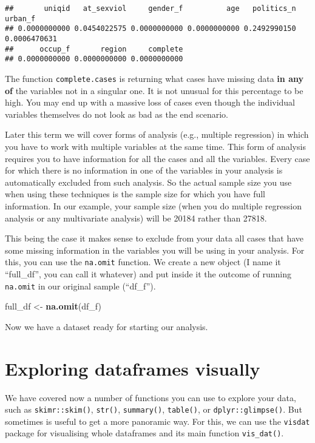 \documentclass[
]{book}
\newenvironment{Shaded}{\begin{snugshade}}{\end{snugshade}}
\newcommand{\FunctionTok}[1]{\textcolor[rgb]{0.13,0.29,0.53}{\textbf{#1}}}
\newcommand{\NormalTok}[1]{#1}
\newcommand{\OtherTok}[1]{\textcolor[rgb]{0.56,0.35,0.01}{#1}}
\begin{document}
\begin{verbatim}
##       uniqid   at_sexviol     gender_f          age   politics_n      urban_f 
## 0.0000000000 0.0454022575 0.0000000000 0.0000000000 0.2492990150 0.0006470631 
##      occup_f       region     complete 
## 0.0000000000 0.0000000000 0.0000000000
\end{verbatim}

The function \texttt{complete.cases} is returning what cases have missing data \textbf{in any of} the variables not in a singular one. It is not unusual for this percentage to be high. You may end up with a massive loss of cases even though the individual variables themselves do not look as bad as the end scenario.

Later this term we will cover forms of analysis (e.g., multiple regression) in which you have to work with multiple variables at the same time. This form of analysis requires you to have information for all the cases and all the variables. Every case for which there is no information in one of the variables in your analysis is automatically excluded from such analysis. So the actual sample size you use when using these techniques is the sample size for which you have full information. In our example, your sample size (when you do multiple regression analysis or any multivariate analysis) will be 20184 rather than 27818.

This being the case it makes sense to exclude from your data all cases that have some missing information in the variables you will be using in your analysis. For this, you can use the \texttt{na.omit} function. We create a new object (I name it ``full\_df'', you can call it whatever) and put inside it the outcome of running \texttt{na.omit} in our original sample (``df\_f'').

\begin{Shaded}
\begin{Highlighting}[]
\NormalTok{full\_df }\OtherTok{\textless{}{-}} \FunctionTok{na.omit}\NormalTok{(df\_f)}
\end{Highlighting}
\end{Shaded}

Now we have a dataset ready for starting our analysis.

\section{Exploring dataframes visually}\label{exploring-dataframes-visually}

We have covered now a number of functions you can use to explore your data, such as \texttt{skimr::skim()}, \texttt{str()}, \texttt{summary()}, \texttt{table()}, or \texttt{dplyr::glimpse()}. But sometimes is useful to get a more panoramic way. For this, we can use the \texttt{visdat} package for visualising whole dataframes and its main function \texttt{vis\_dat()}.
\end{document}

